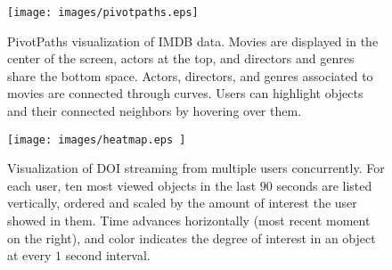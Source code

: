 \begin{figure}[htb]
  \centering
  \texttt{[image: images/pivotpaths.eps]}
  \caption{PivotPaths visualization of IMDB data. Movies are displayed in the center of the screen, actors at the top, and directors and genres share the bottom space. Actors, directors, and genres associated to movies are connected through curves. Users can highlight objects and their connected neighbors by hovering over them.}
	\label{fig:pivotpaths}
\end{figure}

\begin{figure}[htb]
  \centering
  \texttt{[image: images/heatmap.eps ]}
  \caption{Visualization of DOI streaming from multiple users concurrently. For each user, ten most viewed objects in the last $90$ seconds are listed vertically, ordered and scaled by the amount of interest the user showed in them. Time advances horizontally (most recent moment on the right), and color indicates the degree of interest in an object at every $1$ second interval.}
	\label{fig:heatmap}
\end{figure}


